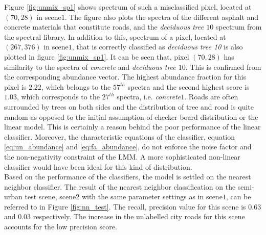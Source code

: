 \documentclass[12pt,twoside]{article}
\theoremstyle{plain}
\theoremstyle{definition}
\theoremstyle{remark}
\newcommand{\forceindent}{\leavevmode{\parindent=2em\indent}}
\begin{document}
Figure \ref{fig:unmix_sp1} shows spectrum of such a misclassified pixel, located at $(70, 28)$ in scene$1$. The figure also plots the spectra of the different asphalt and concrete materials that constitute roads, and the \textit{deciduous tree $10$} spectrum from the spectral library. In addition to this, spectrum of a pixel, located at $(267, 376)$ in scene$1$, that is correctly classified as \textit{deciduous tree 10} is also plotted in figure \ref{fig:unmix_sp1}. It can be seen that, pixel $(70, 28)$ has similarity to the spectra of \textit{concrete} and \textit{deciduous tree $10$}. This is confirmed from the corresponding abundance vector. The highest abundance fraction for this pixel is $2.22$, which belongs to the $57^{th}$ spectra and the second highest score is $1.03$, which corresponds to the $27^{th}$ spectra, i.e. \textit{concrete$1$}. Roads are often surrounded by trees on both sides and the distribution of tree and road is quite random as opposed to the initial assumption of checker-board distribution or the linear model. This is certainly a reason behind the poor performance of the linear classifier. Moreover, the characteristic equations of the classifier, equation \ref{eq:un_abundance} and \ref{eq:fa_abundance}, do not enforce the noise factor and the non-negativity constraint of the LMM. A more sophisticated non-linear classifier would have been ideal for this kind of distribution.\\
\forceindent Based on the performance of the classifiers, the model is settled on the nearest neighbor classifier. The result of the nearest neighbor classification on the semi-urban test scene, scene$2$ with the same parameter settings as in scene$1$, can be referred to in Figure \ref{fig:nn_test}. The recall, precision value for this scene is 0.63 and 0.03 respectively. The increase in the unlabelled city roads for this scene accounts for the low precision score.
\end{document}
